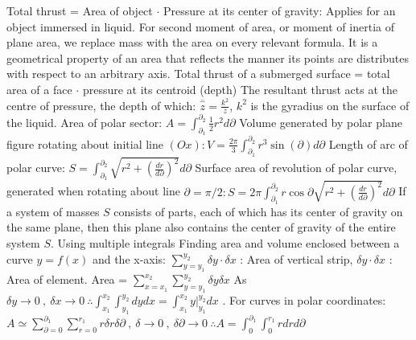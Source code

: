 \documentclass[12pt]{article}
\begin{document}
\begin{flushleft}
	\textbullet \quad Total thrust = Area of object $\cdot$ Pressure at its center of gravity: Applies for an object immersed in liquid. \linebreak 
	\textbullet \quad For second moment of area, or moment of inertia of plane area, we replace mass with the area on every relevant formula. It is a geometrical property of an area that reflects the manner its points are distributes with respect to an arbitrary axis. \linebreak 
	\textbullet \quad Total thrust of a submerged surface = total area of a face $\cdot$ pressure at its centroid (depth) \linebreak 
	\textbullet \quad The resultant thrust acts at the centre of pressure, the depth of which: $\displaystyle \overset{\overset{-}{-}}{z} = \frac{k^2}{z}$, $k^2$ is the gyradius on the surface of the liquid. \linebreak 
	\textbullet \quad Area of polar sector: $\displaystyle A = \int_{\partial_1}^{\partial_2} \frac{1}{2} r^2 d\partial$ \linebreak 
	\textbullet \quad Volume generated by polar plane figure rotating about initial line $\displaystyle (Ox): V = \frac{2\pi}{3} \int_{\partial_1}^{\partial_2} r^3 \sin (\partial) d \partial$ \linebreak 
	\textbullet \quad Length of arc of polar curve: $\displaystyle S = \int_{\partial_1}^{\partial_2} \sqrt{r^2 + \left( \frac{dr}{d\partial} \right)^2} d\partial$ \linebreak 
	\textbullet \quad Surface area of revolution of polar curve, generated when rotating about line $\displaystyle  \partial = \pi / 2: S = 2\pi \int_{\partial_1}^{\partial_2} r \cos \partial \sqrt{r^2 + \left( \frac{dr}{d\partial} \right)^2} d\partial$ \linebreak 
	\textbullet \quad If a system of masses $S$ consists of parts, each of which has its center of gravity on the same plane, then this plane also contains the center of gravity of the entire system $S$. \linebreak 
	Using multiple integrals \linebreak 
	\textbullet \quad Finding area and volume enclosed between a curve $y=f(x)$ and the x-axis: $\displaystyle \sum \limits_{y=y_1}^{y_2} \delta y \cdot \delta x$  :  Area of vertical strip, $\delta y \cdot \delta x$  :  Area of element. \linebreak 
	Area = $\displaystyle \sum \limits_{x=x_1}^{x_2} \sum\limits_{y=y_1}^{y_2} \delta y \delta x$ \linebreak 
	As $\displaystyle \delta y \rightarrow 0\ , \ \delta x \rightarrow 0 \ \therefore \int_{x_1}^{x_2} \int_{y_1}^{y_2} dy dx = \int_{x_1}^{x_2} y \big|_{y_1}^{y_2} dx $ . \linebreak 
	\textbullet \quad For curves in polar coordinates: $\displaystyle A \simeq \sum \limits_{\partial = 0}^{\partial_1} \sum \limits_{r=0}^{r_1} r\delta r \delta \partial \ , \ \delta \rightarrow 0 \ , \ \delta \partial \rightarrow 0 \ \therefore A = \int_0^{\partial_1} \int_0^{r_1} r dr d\partial $ \linebreak 
	

\end{flushleft}
\end{document}
